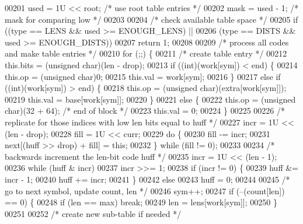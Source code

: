 \begin{DoxyCode}
00201     used = 1U << root;          \textcolor{comment}{/* use root table entries */}
00202     mask = used - 1;            \textcolor{comment}{/* mask for comparing low */}
00203 
00204     \textcolor{comment}{/* check available table space */}
00205     \textcolor{keywordflow}{if} ((type == LENS && used >= ENOUGH\_LENS) ||
00206         (type == DISTS && used >= ENOUGH\_DISTS))
00207         \textcolor{keywordflow}{return} 1;
00208 
00209     \textcolor{comment}{/* process all codes and make table entries */}
00210     \textcolor{keywordflow}{for} (;;) \{
00211         \textcolor{comment}{/* create table entry */}
00212         this.bits = (\textcolor{keywordtype}{unsigned} char)(len - drop);
00213         \textcolor{keywordflow}{if} ((\textcolor{keywordtype}{int})(work[sym]) < end) \{
00214             this.op = (\textcolor{keywordtype}{unsigned} char)0;
00215             this.val = work[sym];
00216         \}
00217         \textcolor{keywordflow}{else} \textcolor{keywordflow}{if} ((\textcolor{keywordtype}{int})(work[sym]) > end) \{
00218             this.op = (\textcolor{keywordtype}{unsigned} char)(extra[work[sym]]);
00219             this.val = base[work[sym]];
00220         \}
00221         \textcolor{keywordflow}{else} \{
00222             this.op = (\textcolor{keywordtype}{unsigned} char)(32 + 64);         \textcolor{comment}{/* end of block */}
00223             this.val = 0;
00224         \}
00225 
00226         \textcolor{comment}{/* replicate for those indices with low len bits equal to huff */}
00227         incr = 1U << (len - drop);
00228         fill = 1U << curr;
00229         \textcolor{keywordflow}{do} \{
00230             fill -= incr;
00231             next[(huff >> drop) + fill] = \textcolor{keyword}{this};
00232         \} \textcolor{keywordflow}{while} (fill != 0);
00233 
00234         \textcolor{comment}{/* backwards increment the len-bit code huff */}
00235         incr = 1U << (len - 1);
00236         \textcolor{keywordflow}{while} (huff & incr)
00237             incr >>= 1;
00238         \textcolor{keywordflow}{if} (incr != 0) \{
00239             huff &= incr - 1;
00240             huff += incr;
00241         \}
00242         \textcolor{keywordflow}{else}
00243             huff = 0;
00244 
00245         \textcolor{comment}{/* go to next symbol, update count, len */}
00246         sym++;
00247         \textcolor{keywordflow}{if} (--(count[len]) == 0) \{
00248             \textcolor{keywordflow}{if} (len == max) \textcolor{keywordflow}{break};
00249             len = lens[work[sym]];
00250         \}
00251 
00252         \textcolor{comment}{/* create new sub-table if needed */}

\end{DoxyCode}
